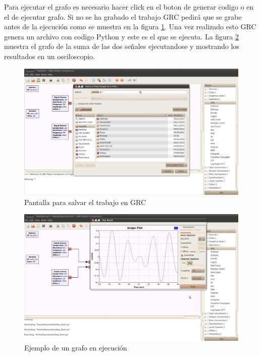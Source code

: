 Para ejecutar el grafo es necesario hacer click en el boton de generar codigo o en el de ejecutar
grafo. Si no se ha grabado el trabajo GRC pedir\'a que se grabe antes de la ejecuci\'on como se
muestra en la figura \ref{fig:savegrc}. Una vez realizado esto GRC genera un archivo con codigo
Python y este es el que se ejecuta. La figura \ref{fig:rungrc} muestra el grafo de la suma de las
dos se\~nales ejecutandose y mostrando los resultados en un osciloscopio.

\begin{figure}[htp]
  \centering
  \includegraphics[width=5.5in]{figs/grc5}
  \vspace{0.3in}
  \caption{Pantalla para salvar el trabajo en GRC}
  \label{fig:savegrc}
\end{figure}

\begin{figure}[htp]
  \centering
  \includegraphics[width=5.5in]{figs/grc7}
  \vspace{0.3in}
  \caption{Ejemplo de un grafo en ejecuci\'on}
  \label{fig:rungrc}
\end{figure}

